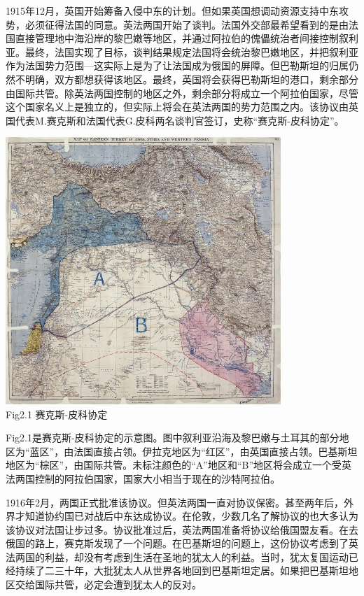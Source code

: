 \documentclass{article}
\begin{document}
1915年12月，英国开始筹备入侵中东的计划。但如果英国想调动资源支持中东攻势，必须征得法国的同意。英法两国开始了谈判。法国外交部最希望看到的是由法国直接管理地中海沿岸的黎巴嫩等地区，并通过阿拉伯的傀儡统治者间接控制叙利亚。最终，法国实现了目标，谈判结果规定法国将会统治黎巴嫩地区，并把叙利亚作为法国势力范围---这实际上是为了让法国成为俄国的屏障。但巴勒斯坦的归属仍然不明确，双方都想获得该地区。最终，英国将会获得巴勒斯坦的港口，剩余部分由国际共管。除英法两国控制的地区之外，剩余部分将成立一个阿拉伯国家，尽管这个国家名义上是独立的，但实际上将会在英法两国的势力范围之内。该协议由英国代表M.赛克斯和法国代表G.皮科两名谈判官签订，史称“赛克斯-皮科协定”。
\begin{center}
    \includegraphics[width=10.4cm]{zd.jpg}\\
    Fig2.1 赛克斯-皮科协定
    \label{fig:Fig2.1}
\end{center}
\clearpage
Fig2.1是赛克斯-皮科协定的示意图。图中叙利亚沿海及黎巴嫩与土耳其的部分地区为“蓝区”，由法国直接占领。伊拉克地区为“红区”，由英国直接占领。巴基斯坦地区为“棕区”，由国际共管。未标注颜色的“A”地区和“B”地区将会成立一个受英法两国控制的阿拉伯国家，国家大小相当于现在的沙特阿拉伯。

1916年2月，两国正式批准该协议。但英法两国一直对协议保密。甚至两年后，外界才知道协约国已对战后中东达成协议。在伦敦，少数几名了解协议的也大多认为该协议对法国让步过多。协议批准过后，英法两国准备将协议给俄国盟友看。在去俄国的路上，赛克斯发现了一个问题。在巴基斯坦的问题上，这份协议考虑到了英法两国的利益，却没有考虑到生活在圣地的犹太人的利益。当时，犹太复国运动已经持续了二三十年，大批犹太人从世界各地回到巴基斯坦定居。如果把巴基斯坦地区交给国际共管，必定会遭到犹太人的反对。
\end{document}
